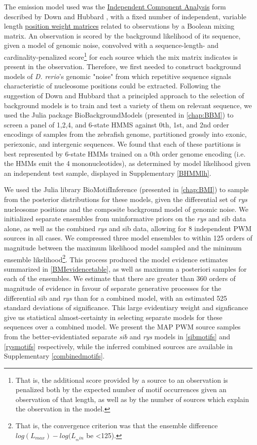 The emission model used was the \hyperref[ssec:ICA]{Independent Component Analysis} form described by Down and Hubbard \cite{Down2005}, with a fixed number of independent, variable length \hyperref[ssec:PWM]{position weight matrices} related to observations by a Boolean mixing matrix. An observation is scored by the background likelihood of its sequence, given a model of genomic noise, convolved with a sequence-length- and cardinality-penalized score\footnote{That is, the additional score provided by a source to an observation is penalized both by the expected number of motif occurrences given an observation of that length, as well as by the number of sources which explain the observation in the model.} for each source which the mix matrix indicates is present in the observation. Therefore, we first needed to construct background models of \textit{D. rerio}'s genomic "noise" from which repetitive sequence signals characteristic of nucleosome positions could be extracted. Following the suggestion of Down and Hubbard \cite{Down2005} that a principled approach to the selection of background models is to train and test a variety of them on relevant sequence, we used the Julia package BioBackgroundModels (presented in \autoref{chap:BBM}) to screen a panel of 1,2,4, and 6-state HMMS against  0th, 1st, and 2nd order encodings of samples from the zebrafish genome, partitioned grossly into exonic, periexonic, and intergenic sequences. We found that each of these partitions is best represented by 6-state HMMs trained on a 0th order genome encoding (i.e. the HMMs emit the 4 mononucleotides), as determined by model likelihood given an independent test sample, displayed in Supplementary \autoref{BHMMlh}.

We used the Julia library BioMotifInference (presented in \autoref{chap:BMI}) to sample from the posterior distributions for these models, given the differential set of \textit{rys} nucleosome positions and the composite background model of genomic noise. We initialized separate ensembles from uninformative priors on the \textit{rys} and sib data alone, as well as the combined \textit{rys} and sib data, allowing for 8 independent PWM sources in all cases. We compressed three model ensembles to within 125 orders of magnitude between the maximum likelihood model sampled and the minimum ensemble likelihood\footnote{That is, the convergence criterion was that the ensemble difference $log(L_{max})-log(L_{_min}$ be <125).}. This process produced the model evidence estimates summarized in \autoref{BMIevidencetable}, as well as maximum a posteriori samples for each of the ensembles. We estimate that there are greater than 360 orders of magnitude of evidence in favour of separate generative processes for the differential sib and \textit{rys} than for a combined model, with an estimated 525 standard deviations of significance. This large evidentiary weight and signficance give us statistical almost-certainty in selecting separate models for these sequences over a combined model. We present the MAP PWM source samples from the better-evidentiated separate \textit{sib} and \textit{rys} models in \autoref{sibmotifs} and \autoref{rysmotifs} respectively, while the inferred combined sources are available in Supplementary \autoref{combinedmotifs}.

